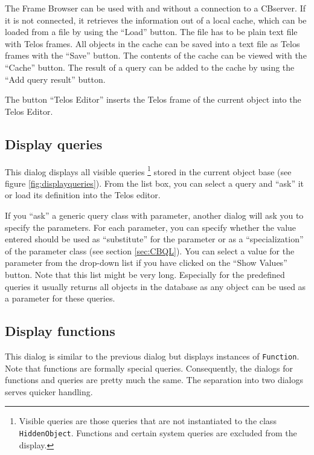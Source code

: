 

The Frame Browser can be used with and without a connection to
a CBserver. If it is not connected, it retrieves the
information out of a local cache, which can be loaded from a file
by using the ``Load'' button. The file has to be plain text file
with Telos frames. All objects in the cache can be saved into a text file
as Telos frames with the ``Save''
button. The contents of the cache can be viewed
with the ``Cache'' button. The result of a query can be added to
the cache by using the ``Add query result'' button.

The button ``Telos Editor'' inserts the Telos frame of the current
object into the Telos Editor.

\subsection{Display queries}
\label{sec:display_queries}

This dialog displays all visible queries%
\footnote{Visible queries are those queries that are not instantiated to the class
{\tt HiddenObject}. Functions and certain system queries are excluded from the display.}
stored in the current object base (see figure \ref{fig:displayqueries}). 
From the list box, you can
select a query and ``ask'' it or load its definition into the Telos editor.


If you ``ask'' a generic query class with parameter, another dialog will
ask you to specify the parameters. For each parameter, you can specify
whether the value entered should be used as ``substitute'' for the parameter
or as a ``specialization'' of the parameter class (see section \ref{sec:CBQL}).
You can select a value for the parameter from the drop-down list if you have
clicked on the ``Show Values'' button. Note that this list might be very long.
Especially for the predefined queries it usually returns all objects in the database
as any object can be used as a parameter for these queries.

\subsection{Display functions}
\label{sec:display_functions}

This dialog is similar to the previous dialog but displays instances
of {\tt Function}. Note that functions are formally special queries.
Consequently, the dialogs for functions and queries are pretty much the same.
The separation into two dialogs serves quicker handling.


